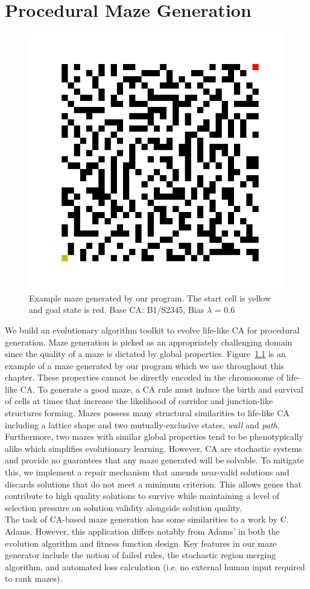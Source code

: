 \chapter{Procedural Maze Generation} \label{procedural}
\begin{figure}[!h]
\centering
    \includegraphics[width=.4\textwidth]{images/maze_example.png}
    \caption{Example maze generated by our program. The start cell is yellow and goal state is red. Base CA: B1/S2345, Bias $\lambda$ = 0.6}
\label{fig:maze-example}
\end{figure}
We build an evolutionary algorithm toolkit to evolve life-like CA for procedural generation. Maze generation is picked as an appropriately challenging domain since the quality of a maze is dictated by global properties. Figure~\ref{fig:maze-example} is an example of a maze generated by our program which we use throughout this chapter. These properties cannot be directly encoded in the chromosome of life-like CA. To generate a good maze, a CA rule must induce the birth and survival of cells at times that increase the likelihood of corridor and junction-like structures forming. Mazes possess many structural similarities to life-like CA including a lattice shape and two mutually-exclusive states, \textit{wall} and \textit{path}. Furthermore, two mazes with similar global properties tend to be phenotypically alike which simplifies evolutionary learning. However, CA are stochastic systems and provide no guarantees that any maze generated will be solvable. To mitigate this, we implement a repair mechanism that amends near-valid solutions and discards solutions that do not meet a minimum criterion. This allows genes that contribute to high quality solutions to survive while maintaining a level of selection pressure on solution validity alongside solution quality.\\

The task of CA-based maze generation has some similarities to a work by C. Adams\cite{adams2018evolving}. However, this application differs notably from Adams' in both the evolution algorithm and fitness function design. Key features in our maze generator include the notion of failed rules, the stochastic region merging algorithm, and automated loss calculation (i.e. no external human input required to rank mazes).\\

